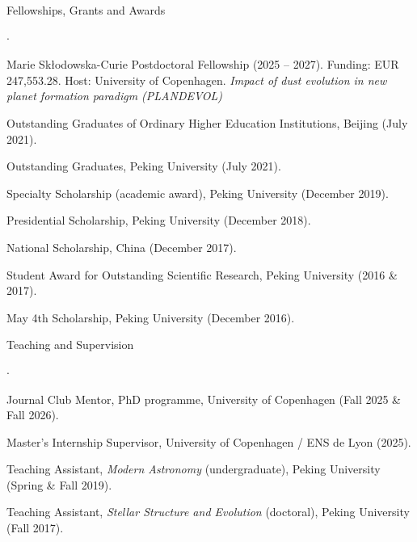 \documentclass{resume} %
\newenvironment{compactcvlist}{%
  \begin{list}{$\cdot$}{%
    \setlength{\leftmargin}{0pt}%
    \setlength{\labelwidth}{0.6em}%
    \setlength{\labelsep}{0.5em}%
    \setlength{\itemsep}{2pt}%
    \setlength{\parsep}{0pt}%
    \setlength{\topsep}{3pt}%
    \setlength{\partopsep}{0pt}%
  }%
}{\end{list}}
\begin{document}
\begin{rSection}{Fellowships, Grants and Awards}
\begin{compactcvlist}
\item Marie Skłodowska-Curie Postdoctoral Fellowship (2025 -- 2027). Funding: EUR 247,553.28. Host: University of Copenhagen. \emph{Impact of dust evolution in new planet formation paradigm (PLANDEVOL)} 

\item Outstanding Graduates of Ordinary Higher Education Institutions, Beijing (July 2021).
\item Outstanding Graduates, Peking University (July 2021).
\item Specialty Scholarship (academic award), Peking University (December 2019).
\item Presidential Scholarship, Peking University (December 2018).
\item National Scholarship, China (December 2017).
\item Student Award for Outstanding Scientific Research, Peking University (2016 \& 2017).
\item May 4th Scholarship, Peking University (December 2016).
\end{compactcvlist}
\end{rSection}


\begin{rSection}{Teaching and Supervision}
\begin{compactcvlist}
\item Journal Club Mentor, PhD programme, University of Copenhagen (Fall 2025 \& Fall 2026).
\item Master's Internship Supervisor, University of Copenhagen / ENS de Lyon (2025).
\item Teaching Assistant, \emph{Modern Astronomy} (undergraduate), Peking University (Spring \& Fall 2019).
\item Teaching Assistant, \emph{Stellar Structure and Evolution} (doctoral), Peking University (Fall 2017).
\end{compactcvlist}
\end{rSection}
\end{document}
